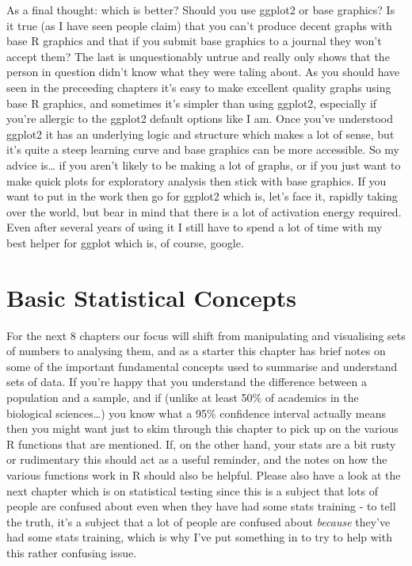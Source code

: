 \documentclass[
]{book}
\begin{document}
As a final thought: which is better? Should you use ggplot2 or base graphics? Is it true (as I have seen people claim) that you can't produce decent graphs with base R graphics and that if you submit base graphics to a journal they won't accept them? The last is unquestionably untrue and really only shows that the person in question didn't know what they were taling about. As you should have seen in the preceeding chapters it's easy to make excellent quality graphs using base R graphics, and sometimes it's simpler than using ggplot2, especially if you're allergic to the ggplot2 default options like I am. Once you've understood ggplot2 it has an underlying logic and structure which makes a lot of sense, but it's quite a steep learning curve and base graphics can be more accessible. So my advice is\ldots{} if you aren't likely to be making a lot of graphs, or if you just want to make quick plots for exploratory analysis then stick with base graphics. If you want to put in the work then go for ggplot2 which is, let's face it, rapidly taking over the world, but bear in mind that there is a lot of activation energy required. Even after several years of using it I still have to spend a lot of time with my best helper for ggplot which is, of course, google.

\hypertarget{basic-statistical-concepts}{%
\chapter{Basic Statistical Concepts}\label{basic-statistical-concepts}}

For the next 8 chapters our focus will shift from manipulating and visualising sets of numbers to analysing them, and as a starter this chapter has brief notes on some of the important fundamental concepts used to summarise and understand sets of data. If you're happy that you understand the difference between a population and a sample, and if (unlike at least 50\% of academics in the biological sciences\ldots) you know what a 95\% confidence interval actually means then you might want just to skim through this chapter to pick up on the various R functions that are mentioned. If, on the other hand, your stats are a bit rusty or rudimentary this should act as a useful reminder, and the notes on how the various functions work in R should also be helpful. Please also have a look at the next chapter which is on statistical testing since this is a subject that lots of people are confused about even when they have had some stats training - to tell the truth, it's a subject that a lot of people are confused about \emph{because} they've had some stats training, which is why I've put something in to try to help with this rather confusing issue.
\end{document}
